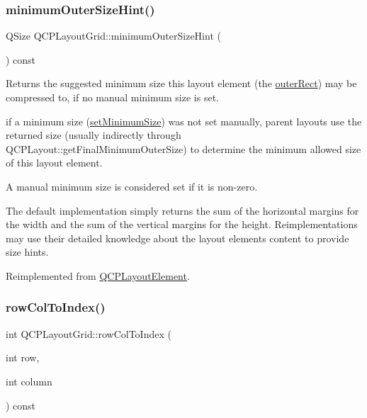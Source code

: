 \mbox{\label{classQCPLayoutGrid_a0438bc58b4d3894d01db95b08d4268df}} 
\subsubsection{\texorpdfstring{minimum\+Outer\+Size\+Hint()}{minimumOuterSizeHint()}}
{\footnotesize\ttfamily Q\+Size Q\+C\+P\+Layout\+Grid\+::minimum\+Outer\+Size\+Hint (\begin{DoxyParamCaption}{ }\end{DoxyParamCaption}) const\hspace{0.3cm}{\ttfamily [virtual]}}

Returns the suggested minimum size this layout element (the \hyperlink{classQCPLayoutElement_a2a32a12a6161c9dffbadeb9cc585510c}{outer\+Rect}) may be compressed to, if no manual minimum size is set.

if a minimum size (\hyperlink{classQCPLayoutElement_a5dd29a3c8bc88440c97c06b67be7886b}{set\+Minimum\+Size}) was not set manually, parent layouts use the returned size (usually indirectly through Q\+C\+P\+Layout\+::get\+Final\+Minimum\+Outer\+Size) to determine the minimum allowed size of this layout element.

A manual minimum size is considered set if it is non-\/zero.

The default implementation simply returns the sum of the horizontal margins for the width and the sum of the vertical margins for the height. Reimplementations may use their detailed knowledge about the layout element\textquotesingle{}s content to provide size hints. 

Reimplemented from \hyperlink{classQCPLayoutElement_a46789036c4fcb190fa374f91321d7c09}{Q\+C\+P\+Layout\+Element}.

\mbox{\label{classQCPLayoutGrid_a682ba76f130810ffd294032a1bfbcfcb}} 
\subsubsection{\texorpdfstring{row\+Col\+To\+Index()}{rowColToIndex()}}
{\footnotesize\ttfamily int Q\+C\+P\+Layout\+Grid\+::row\+Col\+To\+Index (\begin{DoxyParamCaption}\item[{int}]{row,  }\item[{int}]{column }\end{DoxyParamCaption}) const}

